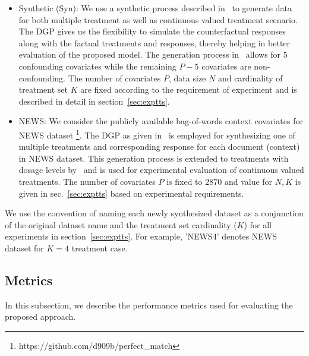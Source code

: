 \documentclass[twoside,11pt]{article}
\begin{document}
\begin{itemize}
\item{Synthetic (\textsf{Syn})}: We use a synthetic process described in~\citep{sun2015causal} to generate data for both multiple treatment as well as continuous valued treatment scenario. The DGP gives us the flexibility to simulate the counterfactual responses along with the factual treatments and responses, thereby helping in better evaluation of the proposed model. The generation process in~\citep{sun2015causal} allows for $5$ confounding covariates while the remaining $P-5$ covariates are non-confounding. The number of covariates $P$, data size $N$ and cardinality of treatment set $K$ are fixed according to the requirement of experiment and is described in detail in section~\ref{sec:exptts}.

\item \textsf{NEWS}: We consider the publicly available bag-of-words context covariates for \textsf{NEWS} dataset \footnote{https://github.com/d909b/perfect\_match}. The DGP as given in~\citep{schwab2018perfect} is employed for synthesizing one of multiple treatments and corresponding response for each document (context) in \textsf{NEWS} dataset. This generation process is extended to treatments with dosage levels by~\citep{schwab2019learning} and is used for experimental evaluation of continuous valued treatments. The number of covariates $P$ is fixed to $2870$ and value for $N,K$ is given in sec.~\ref{sec:exptts} based on experimental requirements.
\end{itemize}
We use the convention of naming each newly synthesized dataset as a conjunction of the original dataset name and the treatment set cardinality ($K$) for all experiments in section~\ref{sec:exptts}.  For example, '\textsf{NEWS4}' denotes \textsf{NEWS} dataset for $K=4$ treatment case.

\subsection{Metrics}
In this subsection, we describe the performance metrics used for evaluating the proposed approach.
\end{document}
